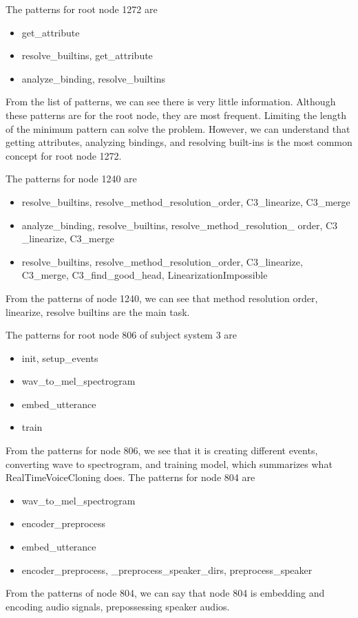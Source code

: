 The patterns for root node 1272 are

\begin{itemize}
    \item get\_attribute
    \item resolve\_builtins, get\_attribute
    \item analyze\_binding, resolve\_builtins
\end{itemize}

From the list of patterns, we can see there is very little information. Although these patterns are for the root node, they are most frequent. Limiting the length of the minimum pattern can solve the problem. However, we can understand that getting attributes, analyzing bindings, and resolving built-ins is the most common concept for root node 1272.

The patterns for node 1240 are 
\begin{itemize}
    \item resolve\_builtins, resolve\_method\_resolution\_order, 
    C3\_linearize, C3\_merge
    \item analyze\_binding, resolve\_builtins, resolve\_method\_resolution\_
    order, C3
    \_linearize, C3\_merge
    \item resolve\_builtins, resolve\_method\_resolution\_order,
    C3\_linearize, C3\_merge, C3\_find\_good\_head, LinearizationImpossible
\end{itemize}
From the patterns of node 1240, we can see that method resolution order, linearize, resolve builtins are the main task.

The patterns for root node 806 of subject system 3 are

\begin{itemize}
    \item init, setup\_events
    \item wav\_to\_mel\_spectrogram
    \item embed\_utterance
    \item train
\end{itemize}

From the patterns for node 806, we see that it is creating different events, converting wave to spectrogram, and training model, which summarizes what Real\-Time\-Voice\-Cloning does. 
The patterns for node 804 are

\begin{itemize}
    \item wav\_to\_mel\_spectrogram
    \item encoder\_preprocess
    \item embed\_utterance
    \item encoder\_preprocess, \_preprocess\_speaker\_dirs,
    preprocess\_speaker
\end{itemize}
From the patterns of node 804, we can say that node 804 is embedding and encoding audio signals, prepossessing speaker audios.

